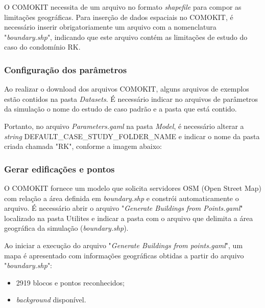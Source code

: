 O COMOKIT necessita de um arquivo no formato \textit{shapefile} para compor as limitações geográficas. Para inserção de dados espaciais no COMOKIT, é necessário inserir obrigatoriamente um arquivo com a nomenclatura "\textit{boundary.shp}", indicando que este arquivo contém as limitações de estudo do caso do condomínio RK.

\subsubsection{Configuração dos parâmetros}

Ao realizar o download dos arquivos COMOKIT, alguns arquivos de exemplos estão contidos na pasta \textit{Datasets}. É necessário indicar no arquivos de parâmetros da simulação o nome do estudo de caso padrão e a pasta que está contido. 

Portanto, no arquivo \textit{Parameters.gaml} na pasta \textit{Model}, é necessário alterar a \textit{string} DEFAULT\_CASE\_STUDY\_FOLDER\_NAME e indicar o nome da pasta criada chamada "RK", conforme a imagem abaixo:



\subsubsection{Gerar edificações e pontos}

O COMOKIT fornece um modelo que solicita servidores OSM (Open Street Map) com relação a área definida em \textit{boundary.shp} e constrói automaticamente o arquivo. 
É necessário abrir o arquivo "\textit{Generate Buildings from Points.gaml}"  localizado na pasta Utilites e indicar a pasta com o arquivo que delimita a área geográfica da simulação (\textit{boundary.shp}).


Ao iniciar a execução do arquivo "\textit{Generate Buildings from  points.gaml}", um mapa é apresentado com informações geográficas obtidas a partir do arquivo "\textit{boundary.shp}":

\begin{itemize}
\item 2919 blocos e pontos reconhecidos;
\item \textit{background} disponível.
\end{itemize}


